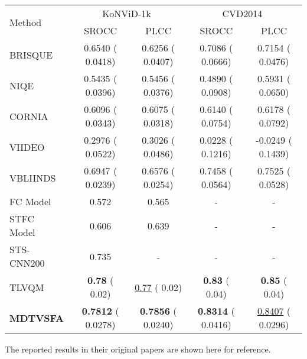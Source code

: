 \documentclass[twocolumn]{svjour3}          \smartqed  \usepackage{graphicx}
\begin{document}
\begin{table*}[!hbt]
\begin{small}
    \bigskip
    
\begin{tabular}{l|cc|cc}
    \toprule
    \multirow{2}{*}{Method} & \multicolumn{2}{c|}{KoNViD-1k~\citep{hosu2017konstanz}} & \multicolumn{2}{c}{CVD2014~\citep{nuutinen2016cvd2014}} \\
    & SROCC & PLCC & SROCC & PLCC \Bstrut\\
    \hline
    BRISQUE~\citep{mittal2012no}  & 0.6540 ( 0.0418) & 0.6256 ( 0.0407)  & 0.7086 ( 0.0666) & 0.7154 ( 0.0476) \Tstrut\\
    NIQE~\citep{mittal2013making}  & 0.5435 ( 0.0396) & 0.5456 ( 0.0376) & 0.4890 ( 0.0908)  & 0.5931 ( 0.0650) \\
    CORNIA~\citep{ye2012unsupervised}  & 0.6096 ( 0.0343) & 0.6075 ( 0.0318) & 0.6140 ( 0.0754) & 0.6178 ( 0.0792) \\
    VIIDEO~\citep{mittal2016completely}  & 0.2976 ( 0.0522) & 0.3026 ( 0.0486)  & 0.0228 ( 0.1216) & -0.0249 ( 0.1439) \\
    VBLIINDS~\citep{saad2014blind} & 0.6947 ( 0.0239) & 0.6576 ( 0.0254)  & 0.7458 ( 0.0564) & 0.7525 ( 0.0528) \\
    FC Model~\citep{men2017empirical} & 0.572 & 0.565 & - & -\\
    STFC Model~\citep{men2018spatiotemporal} & 0.606 & 0.639 & - & -\\
    STS-CNN200~\citep{yan2019no} & 0.735 & - & - & -\\
    TLVQM~\citep{korhonen2019two} & \textbf{0.78} ( 0.02) & \underline{0.77} ( 0.02)  & \textbf{0.83} ( 0.04) & \textbf{0.85} ( 0.04)  \Bstrut\\
    \hline
    \textbf{MDTVSFA} & \textbf{0.7812} ( 0.0278) & \textbf{0.7856} ( 0.0240) & \textbf{0.8314} ( 0.0416) & \underline{0.8407} ( 0.0296) \Tstrut\\
    \bottomrule
    \end{tabular}


    \vspace{1mm}
    
    The reported results in their original papers are shown here for reference.
    \end{small}
\end{table*}
\end{document}
